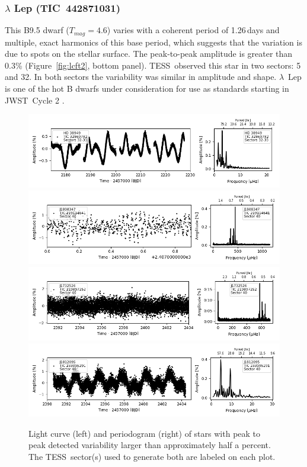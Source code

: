 \documentclass[twocolumn, linenumbers]{aastex631}
\newcommand{\jwst}{JWST}
\newcommand{\tess}{TESS}
\begin{document}
\subsubsection{$\lambda$ Lep (TIC~442871031)}

This B9.5 dwarf ($T_{mag}=4.6$) varies with a coherent period of 1.26\,days and multiple, exact harmonics of this base period, which suggests that the variation is due to spots on the stellar surface. The peak-to-peak amplitude is greater than 0.3\% (Figure~\ref{fig:lcft2}, bottom panel). \tess\ observed this star in two sectors: 5 and 32. In both sectors the variability was similar in amplitude and shape. $\lambda$~Lep is one of the hot B dwarfs under consideration for use as standards starting in \jwst\ Cycle 2 \citep{Gordon2022inprep}. 



\begin{figure}
    \centering
    \includegraphics[width=0.9\linewidth]{figures/tic00000032869782_s323_norm1.fits.png}
    \includegraphics[width=0.9\linewidth]{figures/tic00000219114641_s040_flat2.fits.png}
    \includegraphics[width=0.9\linewidth]{figures/tic00000219897252_s040_norm1.fits.png}
    \includegraphics[width=0.9\linewidth]{figures/tic00000233095291_s040_flat1.fits.png}
    \caption{Light curve (left) and periodogram (right) of stars with peak to peak detected variability larger than approximately half a percent. The \tess\ sector(s) used to generate both are labeled on each plot.}
    \label{fig:lcft1}
\end{figure}
\end{document}
